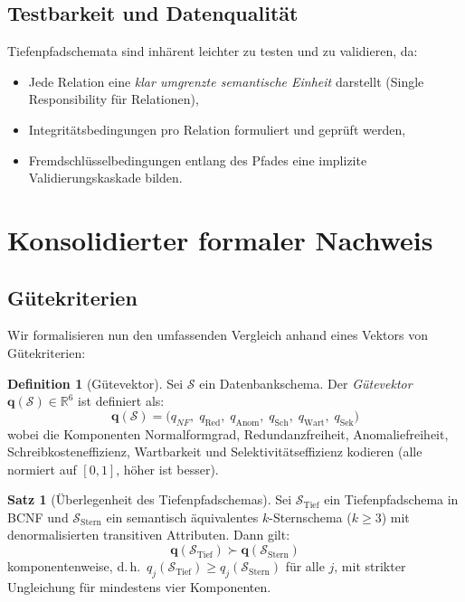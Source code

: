 ﻿\documentclass[12pt,a4paper]{article}
\theoremstyle{definition}
\newtheorem{definition}{Definition}[section]
\newtheorem{theorem}{Satz}[section]
\theoremstyle{remark}
\newcommand{\NF}{\mathit{NF}}
\begin{document}
\subsection{Testbarkeit und Datenqualität}

Tiefenpfadschemata sind inhärent leichter zu testen und zu validieren,
da:
\begin{itemize}
  \item Jede Relation eine \emph{klar umgrenzte semantische Einheit} darstellt
        (Single Responsibility für Relationen),
  \item Integritätsbedingungen pro Relation formuliert und geprüft werden,
  \item Fremdschlüsselbedingungen entlang des Pfades eine implizite
        Validierungskaskade bilden.
\end{itemize}

\section{Konsolidierter formaler Nachweis}
\label{sec:beweis}

\subsection{Gütekriterien}

Wir formalisieren nun den umfassenden Vergleich anhand eines Vektors von
Gütekriterien:

\begin{definition}[Gütevektor]
Sei $\mathcal{S}$ ein Datenbankschema. Der \emph{Gütevektor}
$\mathbf{q}(\mathcal{S}) \in \mathbb{R}^6$ ist definiert als:
\[
  \mathbf{q}(\mathcal{S}) = \bigl(
    q_{\NF},\; q_{\text{Red}},\; q_{\text{Anom}},\;
    q_{\text{Sch}},\; q_{\text{Wart}},\; q_{\text{Sek}}
  \bigr)
\]
wobei die Komponenten Normalformgrad, Redundanzfreiheit,
Anomaliefreiheit, Schreibkosteneffizienz, Wartbarkeit und
Selektivitätseffizienz kodieren (alle normiert auf $[0,1]$,
höher ist besser).
\end{definition}

\begin{theorem}[Überlegenheit des Tiefenpfadschemas]
\label{thm:hauptsatz}
Sei $\mathcal{S}_{\text{Tief}}$ ein Tiefenpfadschema in BCNF und
$\mathcal{S}_{\text{Stern}}$ ein semantisch äquivalentes $k$-Sternschema
($k \geq 3$) mit denormalisierten transitiven Attributen. Dann gilt:
\[
  \mathbf{q}(\mathcal{S}_{\text{Tief}}) \succ \mathbf{q}(\mathcal{S}_{\text{Stern}})
\]
komponentenweise, d.\,h.\ $q_j(\mathcal{S}_{\text{Tief}}) \geq q_j(\mathcal{S}_{\text{Stern}})$
für alle $j$, mit strikter Ungleichung für mindestens vier Komponenten.
\end{theorem}
\end{document}
